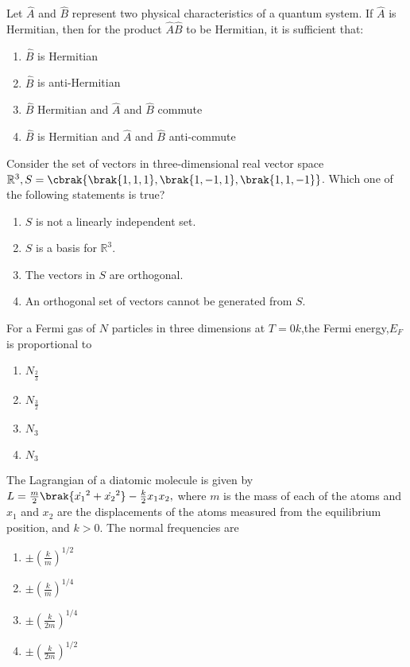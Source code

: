 \item  Let $ \hat{A} $ and $ \hat{B} $ represent two physical characteristics of a quantum system. If $ \hat{A} $ is Hermitian, then for the product $\hat{A}\hat{B} $ to be Hermitian, it is sufficient that:
\begin{enumerate}
\item   $\hat{B}$ is Hermitian
\item   $\hat{B}$ is anti-Hermitian
\item   $\hat{B}$  Hermitian and  $\hat{A}$ and  $\hat{B}$  commute
\item   $\hat{B}$  is Hermitian and  $\hat{A}$  and $\hat{B}$ anti-commute
\end{enumerate}
\item Consider the set of vectors in three-dimensional real vector space\\
$\mathbb{R}^{3},S=\cbrak{\brak{1,1,1},\brak{1,-1,1},\brak{1,1,-1}}$. Which one of the following statements is true?
\begin{enumerate}
    \item $S$ is not a linearly independent set.
    \item $S$ is a basis for $\mathbb{R}^{3}$.
    \item The vectors in $S$ are orthogonal.
    \item An orthogonal set of vectors cannot be generated from $S$.
\end{enumerate}
\item For a Fermi gas of $N$ particles in three dimensions at $T=0k$,the Fermi energy,$E_{F}$ is proportional to
\begin{enumerate}
    \item $N_{\frac{2}{3}}$
    \item $N_{\frac{3}{2}}$
    \item $N_{3}$
    \item $N_{3}$
\end{enumerate}
\item  The Lagrangian of a diatomic molecule is given by $L = \frac{m}{2}\brak{\dot{x_1}^{2} + \dot{x_2}^{2}} - \frac{k}{2}x_{1}x_{2},$
where $m$ is the mass of each of the atoms and $x_{1}$ and $x_{2}$ are the displacements of the atoms measured from the equilibrium position, and $k > 0$. The normal frequencies are 
\begin{multicols}{4}
\begin{enumerate}
\item $\pm \left(\frac{k}{m}\right)^{1/2}$ 
\item $\pm \left(\frac{k}{m}\right)^{1/4}$ 
\item $\pm \left(\frac{k}{2m}\right)^{1/4}$ 
\item $\pm \left(\frac{k}{2m}\right)^{1/2}$
\end{enumerate}
\end{multicols}

